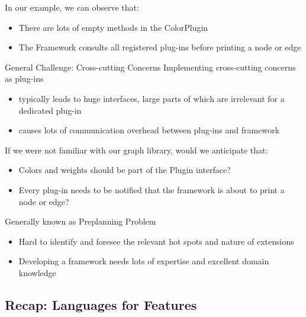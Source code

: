 \begin{frame}{\myframetitle}
	\begin{mycolumns}[widths={50,50}]
		\begin{example}{}
			In our example, we can observe that:
			\begin{itemize}
				\item There are lots of empty methods in the ColorPlugin 
				\item The Framework consults all registered plug-ins before printing a node or edge
			\end{itemize}
		\end{example}
		\begin{definition}{General Challenge: Cross-cutting Concerns}
			Implementing cross-cutting concerns as plug-ins 
			\begin{itemize}				
				\item typically leads to huge interfaces, large parts of which are irrelevant for a dedicated plug-in 
				\item causes lots of communication overhead between plug-ins and framework
			\end{itemize}
		\end{definition}
	\mynextcolumn
		\begin{example}{}
			If we were not familiar with our graph library, would we anticipate that:
			\begin{itemize}
				\item Colors and weights should be part of the Plugin interface?
				\item Every plug-in needs to be notified that the framework is about to print a node or edge? 
			\end{itemize}
		\end{example}
		\begin{definition}{Generally known as Preplanning Problem}
			\begin{itemize}
				\item Hard to identify and foresee the relevant hot spots and nature of extensions
				\item Developing a framework needs lots of expertise and excellent domain knowledge 
			\end{itemize}
		\end{definition}
	\end{mycolumns}
\end{frame}

\subsection{Recap: Languages for Features}

